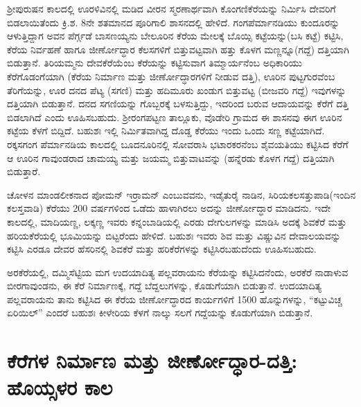 ಶ‍್ರೀಪುರುಷನ ಕಾಲದಲ್ಲಿ ಊರಳಿವಿನಲ್ಲಿ ಮಡಿದ ವೀರನ ಸ್ಮರಣಾರ್ಥವಾಗಿ ಕೊಂಗಣಿಕೆರೆಯನ್ನು ನಿರ್ಮಿಸಿ ದೇವರಿಗೆ ಬಿಡಲಾಯಿತೆಂದು ಕ್ರಿ.ಶ. 8ನೇ ಶತಮಾನದ ಪೂರಿಗಾಲಿ ಶಾಸನದಲ್ಲಿ ಹೇಳಿದೆ. ಗಂಗಪೆರ್ಮಾನಡಿಯು ಕುಂದೂರನ್ನು ಆಳುತ್ತಿದ್ದಾಗ ಅವನ ಪೆರ್ಗ್ಗಡೆ ಬಾಸಣಯ್ಯನು ಬೇಲೂರಿನ ಕೆರೆಯ ಮೇಲಕ್ಕೆ ಬೊಯ್ಸಿ ಕಟ್ಟೆಯನ್ನು(ಬಸಿ ಕಟ್ಟೆ) ಕಟ್ಟಿಸಿ, ಕೆರೆಯ ನಿರ್ವಹಣೆ ಹಾಗೂ ಜೀರ್ಣೋದ್ಧಾರ ಕೆಲಸಗಳಿಗೆ ಬಿತ್ತುವಟ್ಟವಾಗಿ ಹತ್ತು ಕೊಳಗ ಮಣ್ಣನ್ನೂ(ಗದ್ದೆ) ದತ್ತಿಯಾಗಿ ಬಿಡುತ್ತಾನೆ. ತಿರಿಯಮ್ಮನು ದೇವಕೆರೆಯೆಂಬ ಕೆರೆಯನ್ನು ಕಟ್ಟಿಸುವಾಗ ತಿಮ್ಮಾರ್ಯನೆಂಬ ಅಧಿಕಾರಿಯು ಕೆರೆಗೊಡಂಗೆಯಾಗಿ (ಕೆರೆಯ ನಿರ್ಮಾಣ ಮತ್ತು ಜೀರ್ಣೋದ್ಧಾರಗಳಿಗೆ ನೀಡುವ ದತ್ತಿ), ಊರಿನ ಪುಟ್ಟಗುರವೆಂಬ ತೆರಿಗೆಯನ್ನು, ಊರ ದನದ ಪೆಟ್ಯ (ಸಗಣಿ) ಮತ್ತು ಹದಿಮೂರು ಖಂಡುಗ ಬಿತ್ತುವಟ್ಟ (ಬೀಜವರಿ ಗದ್ದೆ) ಇವುಗಳನ್ನು ದತ್ತಿಯಾಗಿ ಬಿಡುತ್ತಾನೆ. ದನದ ಸಗಣಿಯನ್ನು ಗೊಬ್ಬರಕ್ಕೆ ಬಳಸುತ್ತಿದ್ದು, ಇದರಿಂದ ಬರುವ ಆದಾಯವನ್ನು ಕೆರೆಗೆ ದತ್ತಿ ಬಿಡಲಾಗಿದೆ ಎಂದು ಊಹಿಸಬಹುದು. ಶ‍್ರೀರಂಗಪಟ್ಟಣ ತಾಲ್ಲೂಕು, ವೊಡೇರಿ ಗ್ರಾಮದ ಈ ಶಾಸನವು ಈಗ ಊರಿನ ಕಟ್ಟೆಯ ಕೆಳಗೆ ಬಿದ್ದಿದೆ. ಬಹುಶಃ ಇಲ್ಲಿ ನಿರ್ಮಿತವಾಗಿದ್ದ ದೊಡ್ಡ ಕೆರೆಯು ಇಂದು ಒಂದು ಸಣ್ಣ ಕಟ್ಟೆಯಾಗಿದೆ. ರಕ್ಕಸಗಂಗ ಪೆರ್ಮಾನಡಿಯ ಕಾಲದಲ್ಲಿ ಬೂದನೂರಿನಲ್ಲಿ ಸೋವರಾಸಿ ಭಟಾರಕರನೆಂಬ ಶೈವಯತಿಯು ಕಟ್ಟಿಸಿದ ಕೆರೆಗೆ ಆ ಊರಿನ ಗಾವುಂಡರಾದ ಚಾಮಯ್ಯ ಮತ್ತು ಜಯಮ್ಮ ಬಿತ್ತುವಾಟವನ್ನು (ಹನ್ನೆರಡು ಕೊಳಗ ಗದ್ದೆ) ದತ್ತಿಯಾಗಿ ಬಿಡುತ್ತಾರೆ.

ಚೋಳನ ಮಾಂಡಲೀಕನಾದ ಪೋಮನ್​ ಇರ್ರಾಮನ್​ ಎಂಬುವವನು, ಇಡೈತುರೈ ನಾಡಿನ, ಸಿರಿಯಕಲಸತ್ತುಪಾಡಿ\break (ಇಂದಿನ ಕಲಸ್ತವಾಡಿ) ಕೆರೆಯು 200 ವರ್ಷಗಳಿಂದ ಒಡೆದು ಹಾಳಾಗಿರಲು ಅದನ್ನು ಜೀರ್ಣೋದ್ಧಾರ ಮಾಡಿದನು. ಇದೇ ಕಾಲದಲ್ಲಿ, ಮಾದಿಯಣ್ಣ, ಲಕ್ಕಣ್ಣ ಇವರು ಕನ್ನಂಬಾಡಿಯಲ್ಲಿ ಎರಡು ದೇಗುಲಗಳನ್ನು ಮಾಡಿಸಿ ಅದಕ್ಕೆ ಶಿವಕೆರೆ ಮತ್ತು ಹರಿಯಕೆರೆಯಲ್ಲಿ ಭೂಮಿಯನ್ನು ಬಿಟ್ಟರೆಂದು ಹೇಳಿದೆ. ಬಹುಶಃ ಇವರು ಶಿವ ಮತ್ತು ವಿಷ್ಣುವಿನ ದೇವಾಲಯವನ್ನು ಕಟ್ಟಿಸಿ ಎರಡೂ ದೇವರ ಹೆಸರಿನಲ್ಲಿ ಶಿವಕೆರೆ ಮತ್ತು ಹರಿಕೆರೆಗಳನ್ನು ಕಟ್ಟಿಸಿರಬಹುದೆಂದು ಊಹಿಸಬಹುದು.

ಅರಕೆರೆಯಲ್ಲಿ, ದಮ್ಮಿಸೆಟ್ಟಿಯ ಮಗ ಉದಯಾದಿತ್ಯ ಪಲ್ಲವರಾಯನು ಕೆರೆಯನ್ನು ಕಟ್ಟಿಸಿದನೆಂದು, ಅರಕೆರೆ ನಾಡಾಳುವ ಬೀರಗಾವುಂಡನು, ಈ ಕೆರೆ ನಿರ್ಮಾಣಕ್ಕೆ, ಗದ್ದೆ ಬೆದ್ದಲುಗಳನ್ನು, ಕೊಡುಗೆಯಾಗಿ ಬಿಡುತ್ತಾನೆ. ಉದಯಾದಿತ್ಯ ಪಲ್ಲವರಾಯನು ತಾನು ಕಟ್ಟಿಸಿದ ಈ ಕೆರೆಯ ಜೀರ್ಣೋದ್ಧಾರದ ಕಾರ್ಯಗಳಿಗೆ 1500 ಹೊನ್ನುಗಳನ್ನು, “ಕಟ್ಟುವಿಚ್ಚ ಏರಿಯಿಲ್​” ಎಂದರೆ ಬಹುಶಃ ಕೀಳೇರಿಯ ಕೆಳಗೆ ನಾಲ್ಕು ಸಲಗೆ ಗದ್ದೆಯನ್ನು ಕೊಡುಗೆಯಾಗಿ ಬಿಡುತ್ತಾನೆ.

\section*{ಕೆರೆಗಳ ನಿರ್ಮಾಣ ಮತ್ತು ಜೀರ್ಣೋದ್ಧಾರ-ದತ್ತಿ: ಹೊಯ್ಸಳರ ಕಾಲ}

